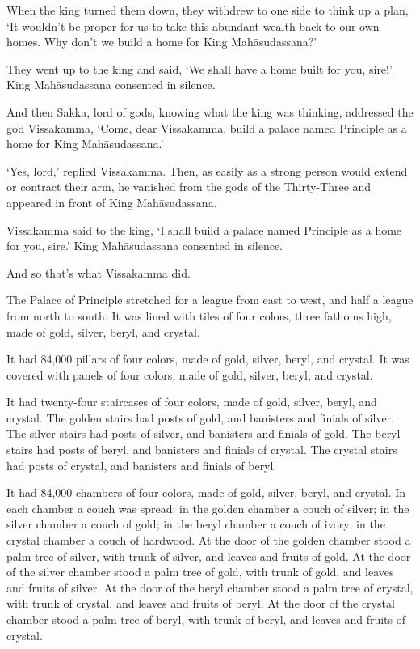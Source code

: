 \documentclass[12pt,openany]{book}%
\begin{document}
When the king turned them down, they withdrew to one side to think up a plan, ‘It wouldn’t be proper for us to take this abundant wealth back to our own homes. Why don’t we build a home for King \textsanskrit{Mahāsudassana}?’ 

They went up to the king and said, ‘We shall have a home built for you, sire!’ King \textsanskrit{Mahāsudassana} consented in silence. 

And then Sakka, lord of gods, knowing what the king was thinking, addressed the god Vissakamma, ‘Come, dear Vissakamma, build a palace named Principle as a home for King \textsanskrit{Mahāsudassana}.’ 

‘Yes, lord,’ replied Vissakamma. Then, as easily as a strong person would extend or contract their arm, he vanished from the gods of the Thirty-Three and appeared in front of King \textsanskrit{Mahāsudassana}. 

Vissakamma said to the king, ‘I shall build a palace named Principle as a home for you, sire.’ King \textsanskrit{Mahāsudassana} consented in silence. 

And so that’s what Vissakamma did. 

The Palace of Principle stretched for a league from east to west, and half a league from north to south. It was lined with tiles of four colors, three fathoms high, made of gold, silver, beryl, and crystal. 

It had 84,000 pillars of four colors, made of gold, silver, beryl, and crystal. It was covered with panels of four colors, made of gold, silver, beryl, and crystal. 

It had twenty-four staircases of four colors, made of gold, silver, beryl, and crystal. The golden stairs had posts of gold, and banisters and finials of silver. The silver stairs had posts of silver, and banisters and finials of gold. The beryl stairs had posts of beryl, and banisters and finials of crystal. The crystal stairs had posts of crystal, and banisters and finials of beryl. 

It had 84,000 chambers of four colors, made of gold, silver, beryl, and crystal. In each chamber a couch was spread: in the golden chamber a couch of silver; in the silver chamber a couch of gold; in the beryl chamber a couch of ivory; in the crystal chamber a couch of hardwood. At the door of the golden chamber stood a palm tree of silver, with trunk of silver, and leaves and fruits of gold. At the door of the silver chamber stood a palm tree of gold, with trunk of gold, and leaves and fruits of silver. At the door of the beryl chamber stood a palm tree of crystal, with trunk of crystal, and leaves and fruits of beryl. At the door of the crystal chamber stood a palm tree of beryl, with trunk of beryl, and leaves and fruits of crystal. 
\end{document}
